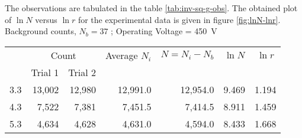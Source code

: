 	The observations are tabulated in the table \ref{tab:inv-sq-g-obs}. The obtained plot of $ \ln N $ versus $ \ln r $ for the experimental data is given in figure \ref{fig:lnN-lnr}.\vspace{0.3cm}\\
		Background counts, $ N_b = 37 $ ; Operating Voltage = \SI{450}{\volt}
\begin{table}[H]
	\begin{tabular}{|r|r|r|r|r|r|r|}
		\hline
		\rowcolor[HTML]{EFEFEF} 
		\multicolumn{1}{|c|}{\cellcolor[HTML]{EFEFEF}Distance} & \multicolumn{2}{c|}{\cellcolor[HTML]{EFEFEF}Count}                                                     & \multicolumn{1}{c|}{\cellcolor[HTML]{EFEFEF}Average $ N_i $} & \multicolumn{1}{c|}{\cellcolor[HTML]{EFEFEF}$ N=N_i-N_b $} & \multicolumn{1}{c|}{\cellcolor[HTML]{EFEFEF}$ \ln N $} & \multicolumn{1}{c|}{\cellcolor[HTML]{EFEFEF}$ \ln r	 $} \\ \cline{2-3}
		\rowcolor[HTML]{EFEFEF} 
		\multicolumn{1}{|c|}{\cellcolor[HTML]{EFEFEF}($ \times 10^{-2} $ m)}      & \multicolumn{1}{c|}{\cellcolor[HTML]{EFEFEF}Trial 1} & \multicolumn{1}{c|}{\cellcolor[HTML]{EFEFEF}Trial 2} & \multicolumn{1}{l|}{\cellcolor[HTML]{EFEFEF}}           & \multicolumn{1}{l|}{\cellcolor[HTML]{EFEFEF}}        & \multicolumn{1}{l|}{\cellcolor[HTML]{EFEFEF}}     & \multicolumn{1}{l|}{\cellcolor[HTML]{EFEFEF}}     \\ \hline
		3.3                                                    & 13,002                                               & 12,980                                               & 12,991.0                                                & 12,954.0                                             & 9.469                                             & 1.194                                             \\ \hline
		4.3                                                    & 7,522                                                & 7,381                                                & 7,451.5                                                 & 7,414.5                                              & 8.911                                             & 1.459                                             \\ \hline
		5.3                                                    & 4,634                                                & 4,628                                                & 4,631.0                                                 & 4,594.0                                              & 8.433                                             & 1.668                                             \\ \hline

\end{tabular}
\end{table}
